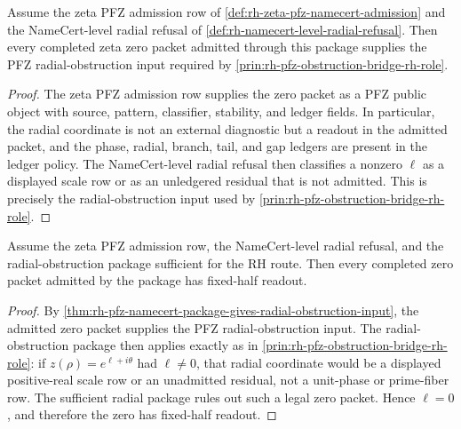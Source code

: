 \begin{theorem}
\label{thm:rh-pfz-namecert-package-gives-radial-obstruction-input}
Assume the zeta PFZ admission row of
\autoref{def:rh-zeta-pfz-namecert-admission} and the NameCert-level
radial refusal of \autoref{def:rh-namecert-level-radial-refusal}.  Then
every completed zeta zero packet admitted through this package supplies
the PFZ radial-obstruction input required by
\autoref{prin:rh-pfz-obstruction-bridge-rh-role}.
\end{theorem}

\begin{proof}
The zeta PFZ admission row supplies the zero packet as a PFZ public
object with source, pattern, classifier, stability, and ledger fields.
In particular, the radial coordinate is not an external diagnostic but a
readout in the admitted packet, and the phase, radial, branch, tail, and
gap ledgers are present in the ledger policy.  The NameCert-level radial
refusal then classifies a nonzero $\ell$ as a displayed scale row or as
an unledgered residual that is not admitted.  This is precisely the
radial-obstruction input used by
\autoref{prin:rh-pfz-obstruction-bridge-rh-role}.
\end{proof}

\begin{theorem}
\label{thm:rh-pfz-namecert-conditional-fixed-half-readout}
Assume the zeta PFZ admission row, the NameCert-level radial refusal, and
the radial-obstruction package sufficient for the RH route.  Then every
completed zero packet admitted by the package has fixed-half readout.
\end{theorem}

\begin{proof}
By
\autoref{thm:rh-pfz-namecert-package-gives-radial-obstruction-input},
the admitted zero packet supplies the PFZ radial-obstruction input.  The
radial-obstruction package then applies exactly as in
\autoref{prin:rh-pfz-obstruction-bridge-rh-role}: if
$z(\rho)=e^{\ell+i\theta}$ had $\ell\ne0$, that radial coordinate would
be a displayed positive-real scale row or an unadmitted residual, not a
unit-phase or prime-fiber row.  The sufficient radial package rules out
such a legal zero packet.  Hence $\ell=0$, and therefore the zero has
fixed-half readout.
\end{proof}
